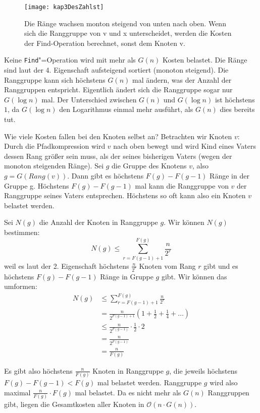 \begin{figure}[hbt]
  \centering
  \texttt{[image: kap3DesZahlst]}
  \caption{Die Ränge wachsen monton steigend von unten nach oben. Wenn sich die Ranggruppe von v und x unterscheidet, werden die Kosten der Find-Operation berechnet, sonst dem Knoten v.}
  \label{kap3DesZahlst}
\end{figure}

Keine \texttt{Find}"=Operation wird mit mehr als $G(n)$ Kosten belastet. Die Ränge sind laut der 4. Eigenschaft aufsteigend sortiert (monoton steigend). Die Ranggruppe kann sich höchstens $G(n)$ mal ändern, was der Anzahl der Ranggruppen entspricht. Eigentlich ändert sich die Ranggruppe sogar nur $G(\log{n})$ mal. Der Unterschied zwischen $G(n)$ und $G(\log n)$ ist höchstens $1$, da $G(\log n)$ den Logarithmus einmal mehr ausführt, als $G(n)$ dies bereits tut.

Wie viele Kosten fallen bei den Knoten selbst an? Betrachten wir Knoten $v$: Durch die Pfadkompression wird $v$ nach oben bewegt und wird Kind eines Vaters dessen Rang größer sein muss, als der seines bisherigen Vaters (wegen der monoton steigenden Ränge). Sei $g$ die Gruppe des Knotens $v$, also $g = G(Rang(v))$. Dann gibt es höchstens $F(g) - F(g-1)$ Ränge in der Gruppe g. Höchstens $F(g) - F(g-1)$ mal kann die Ranggruppe von $v$ der Ranggruppe seines Vaters entsprechen. Höchstens so oft kann also ein Knoten $v$ belastet werden.

Sei $N(g)$ die Anzahl der Knoten in Ranggruppe $g$. Wir können $N(g)$ bestimmen:
\[ N(g) \le \sum_{r=F(g-1)+1}^{F(g)}\frac{n}{2^r} \]
weil es laut der 2. Eigenschaft höchstens $\frac{n}{2^r}$ Knoten vom Rang $r$ gibt und es höchstens $F(g) - F(g-1)$ Ränge in Gruppe $g$ gibt. Wir können das umformen:
\begin{align*}
N(g) &\le \sum_{r=F(g-1)+1}^{F(g)}\frac{n}{2^r}\\
     &= \frac{n}{2^{F(g-1)+1}} (1 + \frac{1}{2} + \frac{1}{4} + \ldots)\\
     &\le \frac{n}{2^{F(g-1)}} \cdot \frac{1}{2} \cdot 2\\
     &= \frac{n}{2^{F(g-1)}} \\
     &= \frac{n}{F(g)}
\end{align*}

Es gibt also höchstens $\frac{n}{F(g)}$ Knoten in Ranggruppe $g$, die jeweils höchstens $F(g) - F(g-1) < F(g)$ mal belastet werden. Ranggruppe $g$ wird also maximal $\frac{n}{F(g)} \cdot F(g)$ mal belastet. Da es nicht mehr als $G(n)$ Ranggruppen gibt, liegen die Gesamtkosten aller Knoten in $\mathcal{O}(n \cdot G(n))$.

